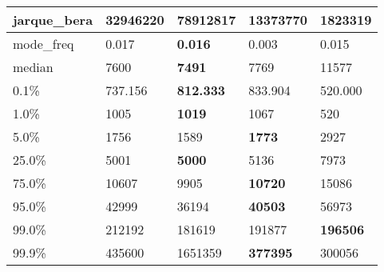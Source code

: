 \begin{table}[H]
\begin{tabular}{|l|m{10em}|m{10em}|m{10em}|m{10em}|}
\hline jarque\_bera & 32946220 & \cellcolor[rgb]{0.9, 0.54, 0.52} 78912817 & \bfseries 13373770 & 1823319 \\
\hline mode\_freq & 0.017 & \bfseries 0.016 & \cellcolor[rgb]{0.9, 0.54, 0.52} 0.003 & 0.015 \\
\hline median & 7600 & \bfseries 7491 & 7769 & \cellcolor[rgb]{0.9, 0.54, 0.52} 11577 \\
\hline 0.1\% & 737.156 & \bfseries 812.333 & 833.904 & \cellcolor[rgb]{0.9, 0.54, 0.52} 520.000 \\
\hline 1.0\% & 1005 & \bfseries 1019 & 1067 & \cellcolor[rgb]{0.9, 0.54, 0.52} 520 \\
\hline 5.0\% & 1756 & 1589 & \bfseries 1773 & \cellcolor[rgb]{0.9, 0.54, 0.52} 2927 \\
\hline 25.0\% & 5001 & \bfseries 5000 & 5136 & \cellcolor[rgb]{0.9, 0.54, 0.52} 7973 \\
\hline 75.0\% & 10607 & 9905 & \bfseries 10720 & \cellcolor[rgb]{0.9, 0.54, 0.52} 15086 \\
\hline 95.0\% & 42999 & 36194 & \bfseries 40503 & \cellcolor[rgb]{0.9, 0.54, 0.52} 56973 \\
\hline 99.0\% & 212192 & \cellcolor[rgb]{0.9, 0.54, 0.52} 181619 & 191877 & \bfseries 196506 \\
\hline 99.9\% & 435600 & \cellcolor[rgb]{0.9, 0.54, 0.52} 1651359 & \bfseries 377395 & 300056 \\
\hline
\end{tabular}
\end{table}
